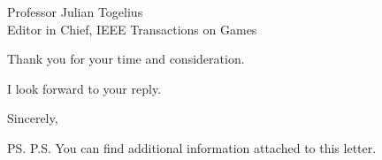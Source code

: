\documentclass[10pt]{letter} %
\begin{document}
\begin{letter}{Professor Julian Togelius \\ Editor in Chief, IEEE Transactions on Games}
\begin{enumerate}
\begin{itemize}
\end{itemize}
\end{enumerate}
 




Thank you for your time and consideration.

I look forward to your reply.

\vspace{2\parskip} %
\closing{Sincerely,}
\vspace{2\parskip} %

\ps{P.S. You can find additional information attached to this letter.} %



\end{letter}
 
\end{document}
